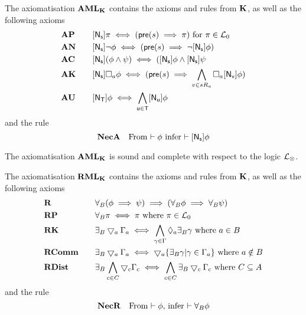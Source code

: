 \begin{defn} \label{axiomAML}
The axiomatisation $\bf AML_{\bf K}$ contains the axioms and rules from $\bf K$, as well as the following axioms
\begin{alignat*}{2}
	& \bf AP && \quad [{\mathrm{\mathsf{N}}_\mathrm{\mathsf{s}}}]\pi \iff (\mathrm{\mathsf{pre}}(s) \implies \pi) \text{ for $\pi \in \mathcal{L}_0$}\\
	& \bf AN && \quad [{\mathrm{\mathsf{N}}_\mathrm{\mathsf{s}}}] \neg \phi \iff (\mathrm{\mathsf{pre}}(s) \implies \neg [{\mathrm{\mathsf{N}}_\mathrm{\mathsf{s}}}] \phi)\\
	& \bf AC && \quad [{\mathrm{\mathsf{N}}_\mathrm{\mathsf{s}}}](\phi \land \psi) \iff ([{\mathrm{\mathsf{N}}_\mathrm{\mathsf{s}}}]\phi \land
			[{\mathrm{\mathsf{N}}_\mathrm{\mathsf{s}}}]\psi\\
	& \bf AK && \quad [{\mathrm{\mathsf{N}}_\mathrm{\mathsf{s}}}]\Box_a\phi \iff (\mathrm{\mathsf{pre}}(s) \implies \bigwedge_{v \in s R_a}
		\Box_a [{\mathrm{\mathsf{N}}_\mathrm{\mathsf{v}}}] \phi) \\
	& \bf AU && \quad [{\mathrm{\mathsf{N}}_\mathrm{\mathsf{T}}}] \phi \iff \bigwedge_{\mathrm{\mathsf{u}} \in \mathrm{\mathsf{T}}} [{\mathrm{\mathsf{N}}_\mathrm{\mathsf{u}}}] \phi
\end{alignat*}
and the rule
\[
	\bf NecA \quad \text{From $\vdash \phi$ infer $\vdash [{\mathrm{\mathsf{N}}_\mathrm{\mathsf{s}}}] \phi$}
\]
\end{defn}

\begin{lemma} \label{axiomAMLSoundComplete}
The axiomatisation $\bf AML_{\bf K}$ is sound and complete with respect to the logic $\mathcal{L}_{\otimes}$.
\end{lemma}

\begin{defn} \label{axiomRML}
The axiomatisation $\bf RML_{\bf K}$ contains the axioms and rules from $\bf K$, as well as the following axioms
\begin{alignat*}{2}
	& \bf R && \quad \forall_B (\phi \implies \psi) \implies (\forall_B \phi \implies \forall_B \psi) \\
	& \bf RP && \quad \forall_B \pi \iff \pi \text{ where } \pi \in \mathcal{L}_0 \\
	& \bf RK && \quad\exists_B \bigtriangledown_a \Gamma_a \iff \bigwedge_{\gamma \in \Gamma} \Diamond_a \exists_B
	\gamma \text{ where } a \in B \\
	& \bf RComm && \quad \exists_B \bigtriangledown_a \Gamma_a \iff \bigtriangledown_a \{ \exists_B \gamma | \gamma \in
	\Gamma_a\} \text{ where } a \notin B\\
	& \bf RDist && \quad \exists_B \bigwedge_{c \in C} \bigtriangledown_c \Gamma_c \iff \bigwedge_{c \in C}
	\exists_B \bigtriangledown_c \Gamma_c \text{ where } C \subseteq A
\end{alignat*}
and the rule
\[
	\bf NecR \quad \text{From $\vdash \phi$, infer $\vdash \forall_B \phi$}
\]
\end{defn}

